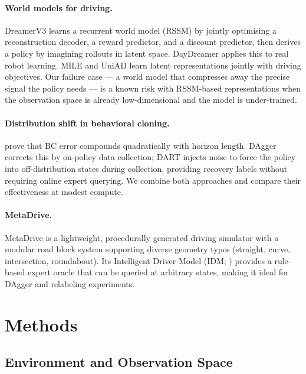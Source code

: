 \documentclass{article}
\begin{document}
\paragraph{World models for driving.}
DreamerV3 \citep{hafner2023dreamerv3} learns a recurrent world model (RSSM)
by jointly optimising a reconstruction decoder, a reward predictor, and a
discount predictor, then derives a policy by imagining rollouts in latent
space. DayDreamer \citep{wu2023daydreamer} applies this to real robot
learning. MILE \citep{hu2022mile} and UniAD \citep{hu2023uniad} learn
latent representations jointly with driving objectives. Our failure case
--- a world model that compresses away the precise signal the policy needs
--- is a known risk with RSSM-based representations when the observation
space is already low-dimensional and the model is under-trained.

\paragraph{Distribution shift in behavioral cloning.}
\citet{ross2010efficient} prove that BC error compounds quadratically with
horizon length. DAgger \citep{ross2011dagger} corrects this by
on-policy data collection; DART \citep{laskey2017dart} injects noise
to force the policy into off-distribution states during collection,
providing recovery labels without requiring online expert querying.
We combine both approaches and compare their effectiveness at modest
compute.

\paragraph{MetaDrive.}
MetaDrive \citep{li2022metadrive} is a lightweight, procedurally generated
driving simulator with a modular road block system supporting diverse
geometry types (straight, curve, intersection, roundabout). Its
Intelligent Driver Model (IDM; \citealt{treiber2000idm}) provides
a rule-based expert oracle that can be queried at arbitrary states,
making it ideal for DAgger and relabeling experiments.

\section{Methods}
\label{sec:methods}

\subsection{Environment and Observation Space}
\end{document}
